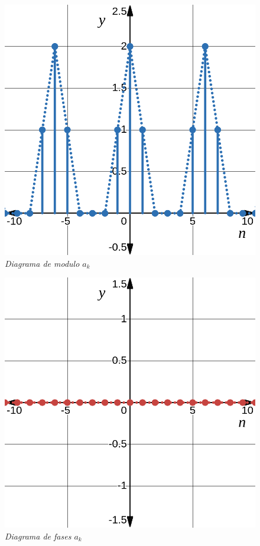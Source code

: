 \documentclass[a4paper,12pt]{report}
\begin{document}
\begin{enumerate}[label=\alph*), left=0pt]
    \begin{figure}[H]
      \centering
      \noindent
      \begin{minipage}{0.4\textwidth}
        \centering
        \includegraphics[width=1\textwidth]{./images/ej5.5.png}
        \textit{Diagrama de modulo $a_k$}
      \end{minipage}
      \hspace{1cm}
      \begin{minipage}{0.4\textwidth}
        \centering
        \includegraphics[width=1\textwidth]{./images/ej5.6.png}
        \textit{Diagrama de fases $a_k$}
      \end{minipage}
    \end{figure}


\end{enumerate}
\end{document}
